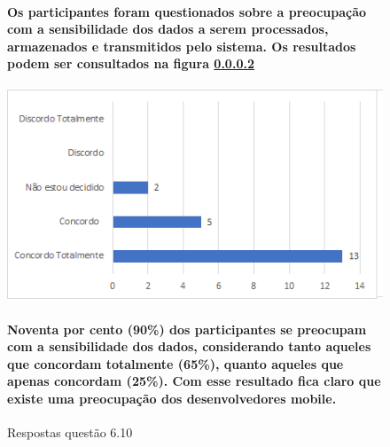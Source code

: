 \begin{figure}[!t]
\centering
\paragraph{Os participantes foram questionados sobre a preocupação com a sensibilidade dos dados a serem processados, armazenados e transmitidos pelo sistema. Os resultados podem ser consultados na figura \ref{fig:6.10}}
\includegraphics[scale=0.7]{figuras das questoes/6.10.png}
\caption{Respostas questão 6.10}
\paragraph{Noventa por cento (90{\%}) dos participantes se preocupam com a sensibilidade dos dados, considerando tanto aqueles que concordam totalmente (65{\%}), quanto aqueles que apenas concordam (25{\%}). Com esse resultado fica claro que existe uma preocupação dos desenvolvedores mobile.}
\label{fig:6.10}
\end{figure}
